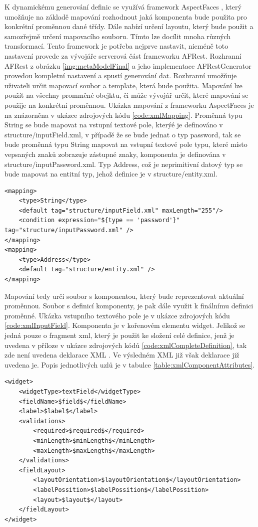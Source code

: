 K dynamickému generování definic se využívá framework AspectFaces \cite{aspectFaces}, který umožňuje na základě mapování rozhodnout jaká komponenta bude použita pro konkrétní proměnnou dané třídy. Dále nabízí určení layoutu, který bude použit a samozřejmě určení mapovacího souboru. Tímto lze docílit mnoha různých transformací. Tento framework je potřeba nejprve nastavit, nicméně toto nastavení provede za vývojáře serverová část frameworku AFRest. Rozhranní AFRest z obrázku \ref{img:metaModelFinal} a jeho implementace AFRestGenerator provedou kompletní nastavení a spustí generování dat. Rozhranní umožňuje uživateli určit mapovací soubor a template, která bude použita. Mapování lze použít na všechny promměné obejktu, či může vývojář určit, které mapování se použije na konkrétní proměnnou. Ukázka mapování z frameworku AspectFaces je na znázorněna v ukázce zdrojových kódu \ref{code:xmlMapping}. Proměnná typu String se bude mapovat na vstupní textové pole, kterýé je definováno v structure/inputField.xml, v případě že se bude jednat o typ password, tak se bude proměnná typu String mapovat na vstupní textové pole typu, které místo vepsaných znaků zobrazuje zástupné znaky, komponenta je definována v structure/inputPassword.xml. Typ Address, což je neprimitivní datový typ se bude mapovat na entitní typ, jehož definice je v structure/entity.xml.
\begin{lstlisting}[caption=Ukázka mapování proměnných na komponenty,
  label={code:xmlMapping}]
<mapping>
	<type>String</type>
	<default tag="structure/inputField.xml" maxLength="255"/>
	<condition expression="${type == 'password'}" tag="structure/inputPassword.xml" />
</mapping>
<mapping>
	<type>Address</type>
	<default tag="structure/entity.xml" />
</mapping>
\end{lstlisting}
Mapování tedy určí soubor s komponentou, který bude reprezentovat aktuální proměnnou. Soubor s definicí komponenty, je pak dále využit k finálnímu definici proměnné. Ukázka vstupního textového pole je v ukázce zdrojových kódu \ref{code:xmlInputField}. Komponenta je v kořenovém elementu widget. Jelikož se jedná pouze o fragment xml, který je použit ke složení celé definice, jenž je uvedena v příloze v ukázce zdrojových kódů \ref{code:xmlCompleteDefinition}, tak zde není uvedena deklarace XML \cite{xml}. Ve výsledném XML již však deklarace již uvedena je. Popis jednotlivých uzlů je v tabulce \ref{table:xmlComponentAttributes}.
\begin{lstlisting}[caption=Ukázka definice komponenty,
  label={code:xmlInputField}]
<widget>
	<widgetType>textField</widgetType>
	<fieldName>$field$</fieldName>
	<label>$label$</label>
	<validations>
		<required>$required$</required>
		<minLength>$minLength$</minLength>
		<maxLength>$maxLength$</maxLength>
	</validations>
	<fieldLayout>
		<layoutOrientation>$layoutOrientation$</layoutOrientation>
		<labelPossition>$labelPossition$</labelPossition>
		<layout>$layout$</layout>
	</fieldLayout>
</widget>
\end{lstlisting}
